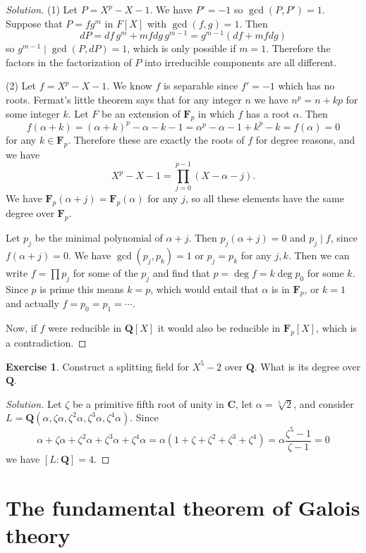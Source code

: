 \documentclass[11pt]{amsart}
\theoremstyle{definition}
\newtheorem{e}[theo]{Exercise}
\newenvironment{s}{\begin{proof}[Solution]}{\end{proof}}
\def\CC{\mathbf{C}}
\def\FF{\mathbf{F}}
\def\QQ{\mathbf{Q}}
\begin{document}
\begin{s}
(1)
Let $P = X^p - X - 1$.
We have $P' = -1$ so $\gcd(P, P') = 1$.
Suppose that $P = fg^m$ in $F[X]$ with $\gcd(f,g) = 1$.
Then
\[
dP = df \, g^m + m f dg \, g^{m-1} 
= g^{m-1}(df + mf dg)
\]
so $g^{m-1} \mid \gcd(P, dP) = 1$, which is only possible if $m = 1$.
Therefore the factors in the factorization of $P$ into irreducible components are all different.

(2)
Let $f = X^p - X - 1$.
We know $f$ is separable since $f' = -1$ which has no roots.
Fermat's little theorem says that for any integer $n$ we have $n^p = n + kp$ for some integer $k$.
Let $F$ be an extension of $\FF_p$ in which $f$ has a root $\alpha$.
Then
\[
f(\alpha + k)
= (\alpha + k)^p - \alpha - k -1
= \alpha^p - \alpha - 1 + k^p - k
= f(\alpha) = 0
\]
for any $k \in \FF_p$.
Therefore these are exactly the roots of $f$ for degree reasons, and we have
\[
X^p - X - 1
= \prod_{j=0}^{p-1} (X - \alpha - j).
\]
We have $\FF_p(\alpha + j) = \FF_p(\alpha)$ for any $j$, so all these elements have the same degree over $\FF_p$.

Let $p_j$ be the minimal polynomial of $\alpha + j$.
Then $p_j(\alpha+j) = 0$ and $p_j \mid f$, since $f(\alpha+j) = 0$.
We have $\gcd(p_j, p_k) = 1$ or $p_j = p_k$ for any $j,k$.
Then we can write $f = \prod p_j$ for some of the $p_j$ and find that $p = \deg f = k \deg p_0$ for some $k$.
Since $p$ is prime this means $k = p$, which would entail that $\alpha$ is in $\FF_p$, or $k = 1$ and actually $f = p_0 = p_1 = \cdots$.

Now, if $f$ were reducible in $\QQ[X]$ it would also be reducible in $\FF_p[X]$, which is a contradiction.
\end{s}


\begin{e}
Construct a splitting field for $X^5 - 2$ over $\QQ$.
What is its degree over $\QQ$.
\end{e}

\begin{s}
Let $\zeta$ be a primitive fifth root of unity in $\CC$, let $\alpha = \sqrt[5] 2$, and consider $L = \QQ(\alpha, \zeta\alpha, \zeta^2\alpha, \zeta^3\alpha, \zeta^4\alpha)$.
Since
\[
\alpha + \zeta\alpha + \zeta^2\alpha + \zeta^3\alpha + \zeta^4\alpha
= \alpha(
1 + \zeta + \zeta^2 + \zeta^3 + \zeta^4
)
= \alpha \frac{\zeta^5 - 1}{\zeta - 1} = 0
\]
we have $[L:\QQ] = 4$.
\end{s}



\section{The fundamental theorem of Galois theory}
\end{document}

